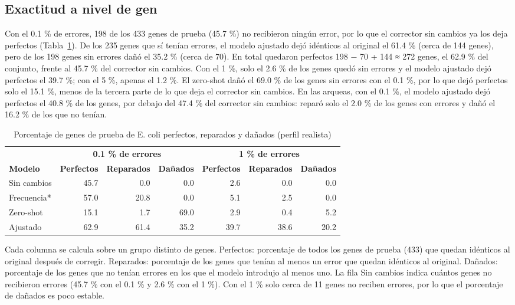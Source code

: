 \documentclass[sigconf,nonacm]{acmart}
\begin{document}
\subsection{Exactitud a nivel de gen}\label{sec:res-gen}

Con el 0.1 \% de errores, 198 de los 433 genes de prueba (45.7 \%) no recibieron ningún error, por lo que el corrector sin cambios ya los deja perfectos (Tabla~\ref{tab:genes}). De los 235 genes que sí tenían errores, el modelo ajustado dejó idénticos al original el 61.4 \% (cerca de 144 genes), pero de los 198 genes sin errores dañó el 35.2 \% (cerca de 70). En total quedaron perfectos 198 − 70 + 144 ≈ 272 genes, el 62.9 \% del conjunto, frente al 45.7 \% del corrector sin cambios. Con el 1 \%, solo el 2.6 \% de los genes quedó sin errores y el modelo ajustado dejó perfectos el 39.7 \%; con el 5 \%, apenas el 1.2 \%. El zero-shot dañó el 69.0 \% de los genes sin errores con el 0.1 \%, por lo que dejó perfectos solo el 15.1 \%, menos de la tercera parte de lo que deja el corrector sin cambios. En las arqueas, con el 0.1 \%, el modelo ajustado dejó perfectos el 40.8 \% de los genes, por debajo del 47.4 \% del corrector sin cambios: reparó solo el 2.0 \% de los genes con errores y dañó el 16.2 \% de los que no tenían.

\begin{table}[t]
\caption{Porcentaje de genes de prueba de E. coli perfectos, reparados y dañados (perfil realista)}
\label{tab:genes}
\small
\begin{tabular}{lrrrrrr}
\toprule
 & \multicolumn{3}{c}{\textbf{0.1 \% de errores}} & \multicolumn{3}{c}{\textbf{1 \% de errores}} \\
\cmidrule(lr){2-4}\cmidrule(lr){5-7}
\textbf{Modelo} & \textbf{Perfectos} & \textbf{Reparados} & \textbf{Dañados} & \textbf{Perfectos} & \textbf{Reparados} & \textbf{Dañados} \\
\midrule
Sin cambios & 45.7 & 0.0 & 0.0 & 2.6 & 0.0 & 0.0 \\
Frecuencia* & 57.0 & 20.8 & 0.0 & 5.1 & 2.5 & 0.0 \\
Zero-shot & 15.1 & 1.7 & 69.0 & 2.9 & 0.4 & 5.2 \\
Ajustado & 62.9 & 61.4 & 35.2 & 39.7 & 38.6 & 20.2 \\
\bottomrule
\end{tabular}

\vspace{2pt}\begin{minipage}{\textwidth}\footnotesize Cada columna se calcula sobre un grupo distinto de genes. Perfectos: porcentaje de todos los genes de prueba (433) que quedan idénticos al original después de corregir. Reparados: porcentaje de los genes que tenían al menos un error que quedan idénticos al original. Dañados: porcentaje de los genes que no tenían errores en los que el modelo introdujo al menos uno. La fila Sin cambios indica cuántos genes no recibieron errores (45.7 \% con el 0.1 \% y 2.6 \% con el 1 \%). Con el 1 \% solo cerca de 11 genes no reciben errores, por lo que el porcentaje de dañados es poco estable.\end{minipage}
\end{table}
\end{document}
